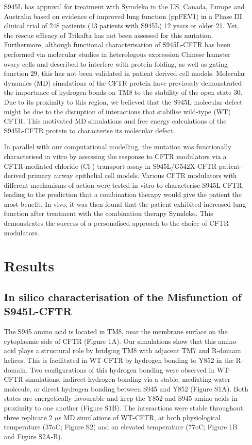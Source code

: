 S945L has approval for treatment with Symdeko in the US, Canada, Europe and Australia based on evidence of improved lung function (ppFEV1) in a Phase III clinical trial of 248 patients (13 patients with S945L) 12 years or older \cite{rowe2017}21. Yet, the rescue efficacy of Trikafta has not been assessed for this mutation. Furthermore, although functional characterisation of S945L-CFTR has been performed via molecular studies in heterologous expression Chinese hamster ovary cells and described to interfere with protein folding, as well as gating function \cite{seibert1996}29, this has not been validated in patient derived cell models. Molecular dynamics (MD) simulations of the CFTR protein have previously demonstrated the importance of hydrogen bonds on TM8 to the stability of the open state \cite{corradi2018}30. Due to its proximity to this region, we believed that the S945L molecular defect might be due to the disruption of interactions that stabilise wild-type (WT) CFTR. This motivated MD simulations and free energy calculations of the S945L-CFTR protein to characterise its molecular defect.

 In parallel with our computational modelling, the mutation was functionally characterised in vitro by assessing the response to CFTR modulators via a CFTR-mediated chloride (Cl-) transport assay in S945L/G542X-CFTR patient-derived primary airway epithelial cell models. Various CFTR modulators with different mechanisms of action were tested in vitro to characterise S945L-CFTR, leading to the prediction that a combination therapy would give the patient the most benefit. In vivo, it was then found that the patient exhibited increased lung function after treatment with the combination therapy Symdeko. This demonstrates the success of a personalised approach to the choice of CFTR modulators. 

\section{Results}

\subsection{In silico characterisation of the Misfunction of S945L-CFTR}
The S945 amino acid is located in TM8, near the membrane surface on the cytoplasmic side of CFTR (Figure 1A). Our simulations show that this amino acid plays a structural role by bridging TM8 with adjacent TM7 and R-domain helices. This is facilitated in WT-CFTR by hydrogen bonding to Y852 in the R-domain. Two configurations of this hydrogen bonding were observed in WT-CFTR simulations, indirect hydrogen bonding via a stable, mediating water molecule, or direct hydrogen bonding between S945 and Y852 (Figure S1A). Both states are energetically favourable and keep the Y852 and S945 amino acids in proximity to one another (Figure S1B). The interactions were stable throughout three replicate 2 $\mu$s MD simulations of WT-CFTR, at both physiological temperature (37oC; Figure S2) and an elevated temperature (77oC; Figure 1B and Figure S2A-B). 

